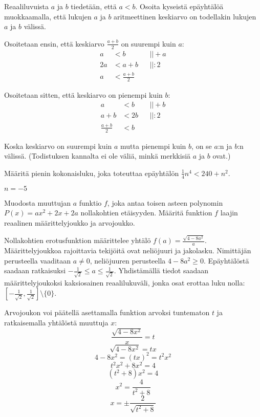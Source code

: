 \begin{multicols}{2}
\begin{tehtava}
Reaaliluvuista $a$ ja $b$ tiedetään, että $a<b$. Osoita kyseistä epäyhtälöä muokkaamalla, että lukujen $a$ ja $b$ aritmeettinen keskiarvo on todellakin lukujen $a$ ja $b$ välissä.
	\begin{vastaus}
	Osoitetaan ensin, että keskiarvo $\frac{a+b}{2}$ on suurempi kuin $a$:
	\begin{align*}
	a&<b && ||+a \\
	2a&<a+b && ||:2 \\
	a&<\frac{a+b}{2} && 
	\end{align*}
	
	Osoitetaan sitten, että keskiarvo on pienempi kuin $b$:
	\begin{align*}
	a&<b && ||+b \\
	a+b&<2b && ||:2 \\
	\frac{a+b}{2}&<b &&
	\end{align*}
	
	Koska keskiarvo on suurempi kuin $a$ mutta pienempi kuin $b$, on se $a$:n ja $b$:n välissä. (Todistuksen kannalta ei ole väliä, minkä merkkisiä $a$ ja $b$ ovat.) 
	\end{vastaus}
\end{tehtava}

\begin{tehtava}
Määritä pienin kokonaisluku, joka toteuttaa epäyhtälön $\frac{1}{4}n^4<240+n^2$.
	\begin{vastaus}
	$n=-5$
	\end{vastaus}
\end{tehtava}

\begin{tehtava}
Muodosta muuttujan $a$ funktio $f$, joka antaa toisen asteen polynomin $P(x)=ax^2+2x+2a$ nollakohtien etäisyyden. Määritä funktion $f$ laajin reaalinen määrittelyjoukko ja arvojoukko.
	\begin{vastaus}
	Nollakohtien erotusfunktion määrittelee yhtälö $f(a)=\frac{\sqrt{4-8a^2}}{a}$. Määrittelyjoukkoa rajoittavia tekijöitä ovat neliöjuuri ja jakolasku. Nimittäjän perusteella vaaditaan $a\neq 0$, neliöjuuren perusteella $4-8a^2\geq 0$. Epäyhtälöstä saadaan ratkaisuksi $-\frac{1}{\sqrt{2}}\leq a \leq \frac{1}{\sqrt{2}}$. Yhdistämällä tiedot saadaan määrittelyjoukoksi kaksiosainen reaalilukuväli, jonka osat erottaa luku nolla: $[-\frac{1}{\sqrt{2}},\frac{1}{\sqrt{2}}] \setminus \lbrace 0 \rbrace$. %
	
Arvojoukon voi päätellä asettamalla funktion arvoksi tuntematon $t$ ja ratkaisemalla yhtälöstä muuttuja $x$:
	$$\frac{\sqrt{4-8x^2}}{x}=t$$
	$$\sqrt{4-8x^2}=tx$$
	$$4-8x^2=(tx)^2=t^2x^2$$
	$$t^2x^2+8x^2=4$$
	$$(t^2+8)x^2=4$$
	$$x^2=\frac{4}{t^2+8}$$
	$$x=\pm \frac{2}{\sqrt{t^2+8}}$$
	

\end{vastaus}
\end{tehtava}
\end{multicols}
